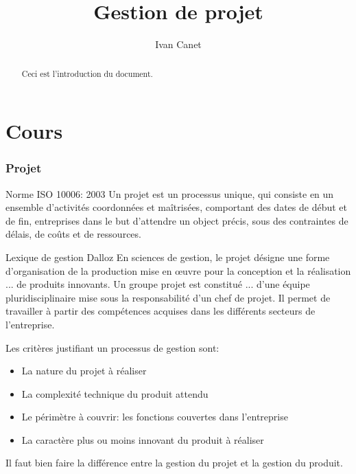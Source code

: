 \documentclass[10pt,a4paper,french]{article}
\begin{document}
\title{Gestion de projet}
\author{Ivan Canet}
\maketitle

\begin{abstract} %
Ceci est l'introduction du document.
\end{abstract}

\tableofcontents

\part{Cours}

\section{Projet}

\begin{cquote}{Norme ISO 10006: 2003}
Un projet est un processus unique, qui consiste en un ensemble d'activités coordonnées et maîtrisées, comportant des dates de début et de fin, entreprises dans le but d'attendre un object précis, sous des contraintes de délais, de coûts et de ressources.
\end{cquote}

\begin{cquote}{Lexique de gestion Dalloz}
En sciences de gestion, le projet désigne une forme d'organisation de la production mise en œuvre pour la conception et la réalisation ... de produits innovants. Un groupe projet est constitué ... d'une équipe pluridisciplinaire mise sous la responsabilité d'un chef de projet. Il permet de travailler à partir des compétences acquises dans les différents secteurs de l'entreprise.
\end{cquote}

Les critères justifiant un processus de gestion sont:
\begin{itemize}
\item La nature du projet à réaliser
\item La complexité technique du produit attendu
\item Le périmètre à couvrir: les fonctions couvertes dans l'entreprise
\item La caractère plus ou moins innovant du produit à réaliser
\end{itemize}

Il faut bien faire la différence entre la gestion du projet et la gestion du produit.
\end{document}
